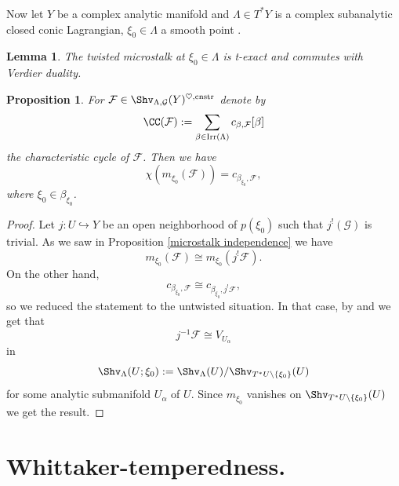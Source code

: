 \documentclass[9pt]{amsart}
\newcommand{\cF}{{\mathcal F}}
\newcommand{\cG}{{\mathcal G}}
\DeclareMathOperator{\Irr}{{Irr}}
\newtheorem{pr}[subsubsection]{Proposition}
\newtheorem{lm}[subsubsection]{Lemma}
\numberwithin{equation}{section}
\begin{document}
	\subsubsection{}  Now let $Y$ be a complex analytic manifold and $\Lambda \in T^*Y$ is a complex subanalytic closed conic Lagrangian, $\xi_0 \in \Lambda$ a smooth point .
	
	\begin{lm}\label{properties of ms}
		The twisted microstalk at $\xi_0 \in \Lambda$ is t-exact and commutes with Verdier duality.
	\end{lm}
	
	\begin{pr}\label{microstalk_cc}
		For $\cF \in \Shv_{\Lambda, \cG}(Y)^{\heartsuit, \operatorname{cnstr}}$ denote by $$\CC(\cF):= \sum_{\beta \in \Irr(\Lambda)} c_{\beta, \cF} [\beta]$$ the characteristic cycle of $\cF$. Then we have 
		$$\chi(m_{\xi_0}(\cF)) = c_{\beta_{\xi_0},\cF},$$
		where $\xi_0 \in  \beta_{\xi_0}$.
	\end{pr}
	
	\begin{proof}
		Let $j:U \hookrightarrow Y$ be an open neighborhood of $p(\xi_0)$ such that $j^!(\cG)$ is trivial. As we saw in Proposition \ref{microstalk independence} we have 
		$$m_{\xi_0}(\cF) \cong m_{\xi_0}(j^!\cF).$$
		On the other hand, $$ c_{\beta_{\xi_0},\cF} \cong  c_{\beta_{\xi_0},j^!\cF},$$
		so we reduced the statement to the untwisted situation. In that case, by \cite[(9.4.9)]{KS} and \cite[Proposition 6.6.1(ii)]{KS} we get that 
		$$j^{-1}\cF \cong V_{U_{\alpha}}$$
		in $$\Shv_{\Lambda}(U; \xi_0):= \Shv_{\Lambda}(U)/\Shv_{T^*U \setminus \{\xi_0\}}(U)$$ for some analytic submanifold $U_{\alpha}$ of $U$. Since $m_{\xi_0}$ vanishes on $\Shv_{T^*U \setminus \{\xi_0\}}(U)$ we get the result.
	\end{proof}

\section{Whittaker-temperedness.}
\end{document}

